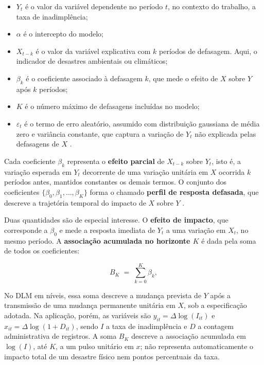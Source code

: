 \begin{itemize}
    \item $Y_t$ é o valor da variável dependente no período $t$, no contexto do trabalho, a taxa de inadimplência;
    \item $\alpha$ é o intercepto do modelo;
    \item $X_{t-k}$ é o valor da variável explicativa com $k$ períodos de defasagem. Aqui, o indicador de desastres ambientais ou climáticos;
    \item $\beta_k$ é o coeficiente associado à defasagem $k$, que mede o efeito de $X$ sobre $Y$ após $k$ períodos;
    \item $K$ é o número máximo de defasagens incluídas no modelo;
    \item $\varepsilon_t$ é o termo de erro aleatório, assumido com distribuição gaussiana
          de média zero e variância constante, que captura a variação de $Y_t$ não
          explicada pelas defasagens de $X$ \citep{liang2024}.
\end{itemize}

Cada coeficiente $\beta_k$ representa o \textbf{efeito parcial} de $X_{t-k}$ sobre $Y_t$,
isto é, a variação esperada em $Y_t$ decorrente de uma variação unitária em $X$ ocorrida $k$
períodos antes, mantidos constantes os demais termos. O conjunto dos coeficientes
$\{\beta_0, \beta_1, \ldots, \beta_K\}$ forma o chamado \textbf{perfil de resposta defasada}, que descreve a trajetória temporal do impacto de $X$ sobre $Y$
\citep{wooldridge2010}.

Duas quantidades são de especial interesse. O \textbf{efeito de impacto}, que corresponde a
$\beta_0$ e mede a resposta imediata de $Y_t$ a uma variação em $X_t$, no mesmo período.
A \textbf{associação acumulada no horizonte $K$} é dada pela soma de todos os coeficientes:

\begin{equation}
    B_K \;=\; \sum_{k=0}^{K} \beta_k,
    \label{eq:efeito_lp}
\end{equation}

\noindent No DLM em níveis, essa soma descreve a mudança prevista de $Y$ após a transmissão de uma mudança permanente unitária em $X$, sob a especificação adotada. Na aplicação, porém, as variáveis são $y_{it}=\Delta\log(I_{it})$ e $x_{it}=\Delta\log(1+D_{it})$, sendo $I$ a taxa de inadimplência e $D$ a contagem administrativa de registros. A soma $B_K$ descreve a associação acumulada em $\log(I)$, até $K$, a um pulso unitário em $x$; não representa automaticamente o impacto total de um desastre físico nem pontos percentuais da taxa.

